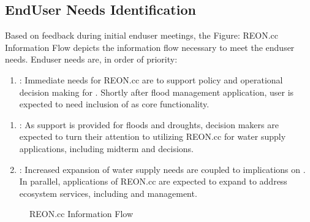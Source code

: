 \documentclass[letterpaper,12pt,english]{book}
\begin{document}
\subsection{End\sphinxhyphen{}User Needs Identification}
\label{\detokenize{requirements/needs/index:end-user-needs-identification}}\label{\detokenize{requirements/needs/index::doc}}
\sphinxAtStartPar
Based on feedback during initial end\sphinxhyphen{}user meetings, the Figure: REON.cc Information Flow depicts the information flow necessary to meet the end\sphinxhyphen{}user needs. End\sphinxhyphen{}user needs are, in order of priority:
\begin{enumerate}
%
\item {} 
\sphinxAtStartPar
{}: Immediate needs for REON.cc are to support policy and operational decision making for . Shortly after flood management application, user is expected to need inclusion of  as core functionality.

\end{enumerate}
\begin{enumerate}
%
\setcounter{enumi}{1}
\item {} 
\sphinxAtStartPar
{}: As support is provided for floods and droughts, decision makers are expected to turn their attention to utilizing REON.cc for water supply applications, including mid\sphinxhyphen{}term  and  decisions.

\item {} 
\sphinxAtStartPar
{}: Increased expansion of water supply needs are coupled to  implications on . In parallel, applications of REON.cc are expected to expand to address ecosystem services, including  and  management.

\end{enumerate}

\begin{figure}[htbp]
\centering
\capstart

\noindent{}
\caption{REON.cc Information Flow}\label{\detokenize{requirements/needs/index:id1}}\end{figure}
\end{document}

